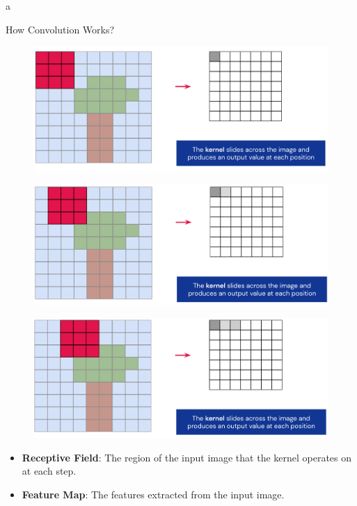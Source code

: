 a\documentclass[10pt]{beamer}
\theoremstyle{remark}
\theoremstyle{definition}
\begin{document}
\begin{frame}[allowframebreaks]{How Convolution Works?}
\begin{figure}
\centering
\includegraphics[width=1.0\textwidth,height=0.9\textheight,keepaspectratio]{./images/conv_7.png}
\end{figure}

\framebreak

\begin{figure}
\centering
\includegraphics[width=1.0\textwidth,height=0.9\textheight,keepaspectratio]{./images/conv_8.png}
\end{figure}

\framebreak

\begin{figure}
\centering
\includegraphics[width=1.0\textwidth,height=0.9\textheight,keepaspectratio]{./images/conv_9.png}
\end{figure}

\framebreak

\begin{itemize}
\item \textbf{Receptive Field}: The region of the input image that the kernel operates on at each step.
\item \textbf{Feature Map}: The features extracted from the input image.
\end{itemize}


\end{frame}
\end{document}
